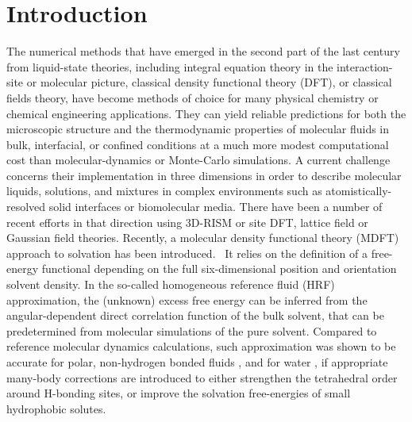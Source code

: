 \documentclass[aip,jcp,preprint]{revtex4-1}
\begin{document}
\section{Introduction}

The numerical  methods that have emerged in the second part of the last century from  liquid-state theories\cite{hansen, gray-gubbins-vol1}, including integral equation theory in the interaction-site\cite{Chandler-RISM,hirata-rossky81,hirata-pettitt-rossky82,reddy03,pettitt07,pettitt08}
or molecular\cite{blum72a,blum72b,patey77,fries-patey85,richardi98,richardi99} picture, classical density functional theory (DFT)\cite{evans79,evans92,Wu07}, or classical fields theory\cite{chandler93,lum99,coalson96}, have become methods of choice for 
many physical chemistry or chemical engineering applications\cite{gray-gubbins-vol2,neimark06,neimark11,wu06}. They can yield reliable predictions for both the microscopic structure and the thermodynamic properties of molecular fluids in bulk, interfacial, or confined conditions at a much more modest computational cost than  molecular-dynamics or Monte-Carlo simulations. 
A current challenge concerns their implementation in three dimensions in order to describe molecular liquids, solutions, and mixtures in  complex environments such as atomistically-resolved solid interfaces or biomolecular media. There have been a number of recent efforts in that direction using 3D-RISM\cite{Beglov-Roux97,kovalenko-hirata98,red-book,yoshida09,kloss08-jcp,kloss08-jpcb} or site DFT\cite{liu13}, lattice field\cite{azuara06,azuara08} or Gaussian field\cite{lum99,tenwolde01,tenwolde02,huang02,varilly11,chandler-varilly11} theories.
Recently, a molecular density functional theory (MDFT) approach to solvation has been
introduced.~\cite{ramirez02,ramirez05-CP,ramirez05,gendre09,zhao11,borgis12,levesque12_1,levesque12_2,jeanmairet13} It relies on the definition of a free-energy functional depending on the full six-dimensional position and orientation solvent density. In the so-called homogeneous reference fluid (HRF) approximation, the (unknown) excess free energy can be inferred from the angular-dependent direct correlation function of the bulk solvent,
that can be predetermined from molecular simulations of the pure solvent. Compared to reference molecular dynamics calculations, such approximation was shown to be accurate for polar, non-hydrogen bonded fluids \cite{ramirez02,gendre09,zhao11,borgis12,levesque12_2}, and for water \cite{zhao11,jeanmairet13,levesque12_1}, if appropriate many-body corrections are introduced to either strengthen the tetrahedral order around H-bonding sites\cite{zhao11,jeanmairet13}, or improve the solvation free-energies of small hydrophobic solutes\cite{levesque12_1}.
\end{document}
